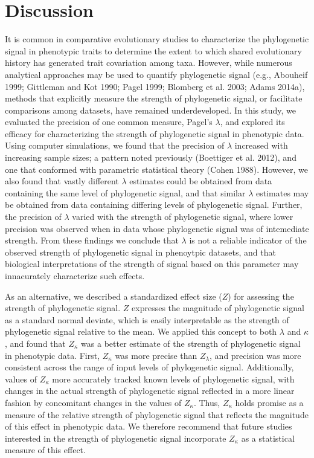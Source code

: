 \documentclass[]{article}
\begin{document}
\hypertarget{discussion}{%
\section{Discussion}\label{discussion}}

It is common in comparative evolutionary studies to characterize the
phylogenetic signal in phenotypic traits to determine the extent to
which shared evolutionary history has generated trait covariation among
taxa. However, while numerous analytical approaches may be used to
quantify phylogenetic signal (e.g., Abouheif 1999; Gittleman and Kot
1990; Pagel 1999; Blomberg et al. 2003; Adams 2014a), methods that
explicitly measure the strength of phylogenetic signal, or facilitate
comparisons among datasets, have remained underdeveloped. In this study,
we evaluated the precision of one common measure, Pagel's \(\lambda\),
and explored its efficacy for characterizing the strength of
phylogenetic signal in phenotypic data. Using computer simulations, we
found that the precision of \(\lambda\) increased with increasing sample
sizes; a pattern noted previously (Boettiger et al. 2012), and one that
conformed with parametric statistical theory (Cohen 1988). However, we
also found that vastly different \(\lambda\) estimates could be obtained
from data containing the same level of phylogenetic signal, and that
similar \(\lambda\) estimates may be obtained from data containing
differing levels of phylogenetic signal. Further, the precision of
\(\lambda\) varied with the strength of phylogenetic signal, where lower
precision was observed when in data whose phylogenetic signal was of
intemediate strength. From these findings we conclude that \(\lambda\)
is not a reliable indicator of the observed strength of phylogenetic
signal in phenoytpic datasets, and that biological interpretations of
the strength of signal based on this parameter may innacurately
characterize such effects. \hfill\break

As an alternative, we described a standardized effect size (\(Z\)) for
assessing the strength of phylogenetic signal. \(Z\) expresses the
magnitude of phylogenetic signal as a standard normal deviate, which is
easily interpretable as the strength of phylogenetic signal relative to
the mean. We applied this concept to both \(\lambda\) and \(\kappa\),
and found that \(Z_\kappa\) was a better estimate of the strength of
phylogenetic signal in phenotypic data. First, \(Z_\kappa\) was more
precise than \(Z_{\lambda}\), and precision was more consistent across
the range of input levels of phylogenetic signal. Additionally, values
of \(Z_\kappa\) more accurately tracked known levels of phylogenetic
signal, with changes in the actual strength of phylogenetic signal
reflected in a more linear fashion by concomitant changes in the values
of \(Z_\kappa\). Thus, \(Z_\kappa\) holds promise as a measure of the
relative strength of phylogenetic signal that reflects the magnitude of
this effect in phenotypic data. We therefore recommend that future
studies interested in the strength of phylogenetic signal incorporate
\(Z_\kappa\) as a statistical measure of this effect. \hfill\break
\end{document}

